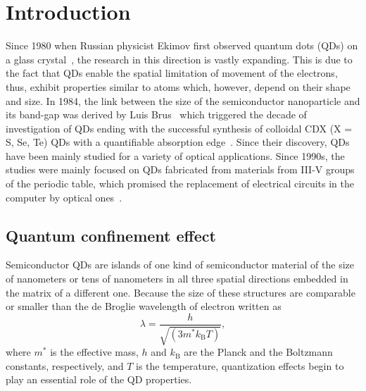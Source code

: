 \documentclass[
a4paper, %
11pt, %
onecolumn, %
openany, %
oldfontcommands,
]{memoir}
\begin{document}
\pagestyle{standard}

\tableofcontents*


\clearpage




\chapter{Introduction}\label{chap:introduction}


Since 1980 when Russian physicist Ekimov first observed quantum dots (QDs) on a glass crystal~\cite{Ekimov}, the research in this direction is vastly expanding. This is due to the fact that QDs enable the spatial limitation of movement of the electrons, thus, exhibit properties similar to atoms which, however, depend on their shape and size. In 1984, the link between the size of the semiconductor nanoparticle and its band-gap was derived by Luis Brus~\cite{Brus} which triggered the decade of investigation of QDs ending with the successful synthesis of colloidal CDX (X = S, Se, Te) QDs with a quantifiable absorption edge~\cite{Murray}. Since their discovery, QDs have been mainly studied for a variety of optical applications. Since 1990s, the studies were mainly focused on QDs fabricated from materials from III-V groups of the periodic table, which promised the replacement of electrical circuits in the computer by optical ones~\cite{Bimberg}. %

\section{Quantum confinement effect}
Semiconductor QDs are islands of one kind of semiconductor material of the size of nanometers or tens of nanometers in all three spatial directions embedded in the matrix of a different one. Because the size of these structures are comparable or smaller than the de Broglie wavelength of electron written as
\begin{equation}
\lambda=\frac{h}{\sqrt{(3m^*k_\mathrm{B}T)}},
\end{equation}
where $m^*$ is the effective mass, $h$ and $k_\mathrm{B}$ are the Planck and the Boltzmann constants, respectively, and $T$ is the temperature, quantization effects begin to play an essential role of the QD properties.
\end{document}
